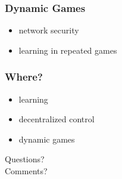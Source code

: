 \begin{frame}
  \frametitle{Dynamic Games}
  \begin{itemize}
  \pause \item network security
  \pause \item learning in repeated games
  \end{itemize}
\end{frame}

{
  \begin{frame}

    \frametitle{\textbf{Where?}}
    \begin{itemize}
    \pause \item learning
    \pause \item decentralized control
    \pause \item dynamic games
    \end{itemize}
  \end{frame}
}


{
  \begin{frame}

    {\Huge Questions? \\ \bigskip \bigskip Comments?}
  \end{frame}
}
